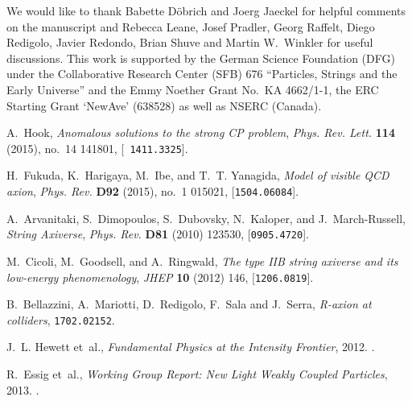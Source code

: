 \documentclass[11pt,a4paper]{article}
\begin{document}
\acknowledgments

We would like to thank Babette D\"obrich and Joerg Jaeckel for helpful comments on the manuscript and Rebecca Leane, Josef Pradler, Georg Raffelt, Diego Redigolo, Javier Redondo, Brian Shuve and Martin W.~Winkler for useful discussions. This work is supported by the German Science Foundation (DFG) under the Collaborative Research Center (SFB) 676 ``Particles, Strings and the Early Universe'' and the Emmy Noether Grant No.\ KA 4662/1-1, the ERC Starting Grant `NewAve' (638528) as well as NSERC (Canada).

\providecommand{\href}[2]{#2}\begingroup\raggedright\begin{thebibliography}{10}

A.~Hook, \href{http://dx.doi.org/10.1103/PhysRevLett.114.141801}{{\it
  {Anomalous solutions to the strong CP problem}}, } {\em Phys. Rev. Lett.}
  {\bf 114} (2015), no.~14 141801, [\href{http://arxiv.org/abs/1411.3325}{{\tt
  1411.3325}}].

H.~Fukuda, K.~Harigaya, M.~Ibe, and T.~T. Yanagida,
  \href{http://dx.doi.org/10.1103/PhysRevD.92.015021}{{\it {Model of visible
  QCD axion}}, } {\em Phys. Rev.} {\bf D92} (2015), no.~1 015021,
  [\href{http://arxiv.org/abs/1504.06084}{{\tt 1504.06084}}].

A.~Arvanitaki, S.~Dimopoulos, S.~Dubovsky, N.~Kaloper, and J.~March-Russell,
  \href{http://dx.doi.org/10.1103/PhysRevD.81.123530}{{\it {String Axiverse}},
  } {\em Phys. Rev.} {\bf D81} (2010) 123530,
  [\href{http://arxiv.org/abs/0905.4720}{{\tt 0905.4720}}].

M.~Cicoli, M.~Goodsell, and A.~Ringwald,
  \href{http://dx.doi.org/10.1007/JHEP10(2012)146}{{\it {The type IIB string
  axiverse and its low-energy phenomenology}}, } {\em JHEP} {\bf 10} (2012)
  146, [\href{http://arxiv.org/abs/1206.0819}{{\tt 1206.0819}}].
  
  B.~Bellazzini, A.~Mariotti, D.~Redigolo, F.~Sala and J.~Serra,
  {\it {R-axion at colliders}}, \href{http://arxiv.org/abs/1702.02152}{{\tt 1702.02152}}.

J.~L. Hewett et~al.,
  \href{http://inspirehep.net/record/1114323/files/arXiv:1205.2671.pdf}{{\it
  {Fundamental Physics at the Intensity Frontier}}, } 2012.
\newblock \href{http://arxiv.org/abs/1205.2671}{{\tt 1205.2671}}.

R.~Essig et~al.,
  \href{http://inspirehep.net/record/1263039/files/arXiv:1311.0029.pdf}{{\it
  {Working Group Report: New Light Weakly Coupled Particles}}, } 2013.
\newblock \href{http://arxiv.org/abs/1311.0029}{{\tt 1311.0029}}.


\end{thebibliography}
\end{document}

